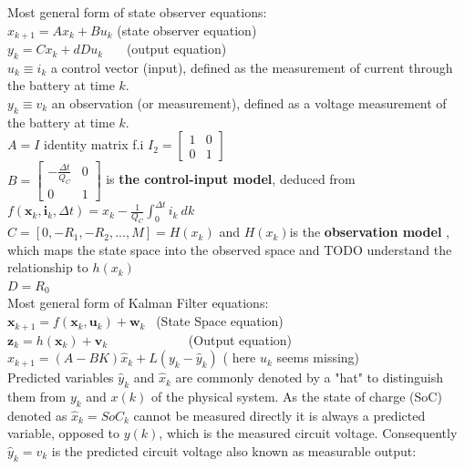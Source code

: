 Most general form of  state observer equations: \\
$ x_{k+1}=Ax_{k}+Bu_{k} $ (state observer equation) \\
$ y_{k}=Cx_{k}+dDu_{k} $ \ \ \  (output equation)\\ 

$u_{k} \equiv i_{k}$ a control vector (input), defined as the measurement of current through the battery at time $k$. \\ 
$y_{k} \equiv v_{k}$ an observation (or measurement), defined as a voltage measurement of the battery at time $k$. \\
$A = I$  identity matrix f.i $I_{2}=\begin{bmatrix}1&0\\0&1\end{bmatrix}$ \\
$B = \begin{bmatrix}-\frac{\Delta t}{{Q_{C}}}&0\\0&1\end{bmatrix} $  is \textbf{the control-input model}, deduced from  $f({\boldsymbol {x}}_{k},{\boldsymbol {i}}_{k},\Delta t) =  {x}_{k} - \frac{1}{{Q_{C}}}\int_{0}^{\Delta t} {i_{k}\ dk} $ \\
$ C = [0, -R_1, -R_2, ..., M] = H(x_k) $ and $H(x_k) $is the \textbf{observation model} , which maps the state space into the observed space and TODO understand the relationship to $ h(x_k)$ \\ 
$ D = R_0 $ \\


Most general form of Kalman Filter equations: \\

$  {\boldsymbol {x}}_{k+1}=f({\boldsymbol {x}}_{k},{\boldsymbol {u}}_{k})+ {\boldsymbol {w}}_{k} $ \ (State Space equation)  \\
$  {\boldsymbol  {z}}_{{k}}=h({\boldsymbol  {x}}_{{k}})+{\boldsymbol  {v}}_{{k}} $ \ \ \ \ \ \ \ \ \ \ \  \ (Output equation)  \\


$ {\hat  {x}}_{k+1}=\left(A-BK\right){\hat  {x}}_{k}+L\left(y_{k}-{\hat  {y}}_{k}\right) $  ( here $u_{k}$ seems missing)\\

Predicted variables $ \hat{y}_{k}$ and $ \hat{x}_{k} $  are commonly denoted by a "hat" to distinguish them from  $ {y}_{k} $ and $ {x}(k) $  of the physical system. As the state of charge (SoC) denoted as $\hat{x}_{k} = SoC_{k}$  cannot be measured directly it is always a predicted variable, opposed to ${y}(k)$, which is the measured circuit voltage. Consequently $ \hat{y}_{k} = {v}_{k} $ is the predicted circuit voltage also known as measurable output: 

